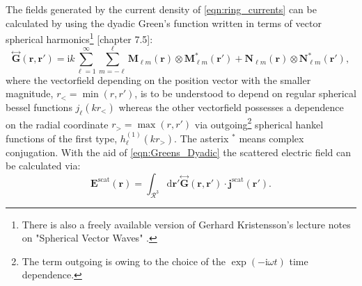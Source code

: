 \documentclass[a4paper,12pt]{scrartcl}  %
\newcommand{\imag}{\mathrm{i}}
\renewcommand{\dyad}[1]{\overset{\bm\leftrightarrow}{#1}}
\newcommand{\rd}{\mathrm{d}}
\begin{document}
The fields generated by the current density of \cref{eqn:ring_currents} can be
calculated by using the dyadic Green's function written in terms of vector spherical harmonics\footnote{There is also a freely available version of Gerhard Kristensson's lecture notes on "Spherical Vector Waves" \citep{Kristensson2014}.} \Cite{Kristensson2016}[chapter 7.5]:
\begin{equation}
\dyad{\mathbf{G}}(\mathbf{r},\mathbf{r}') = \imag k \sum_{\ell=1}^\infty \sum_{m=-\ell}^\ell
\mathbf{M}_{\ell m}(\mathbf{r})\otimes\mathbf{M}_{\ell m}^*(\mathbf{r}')+
\mathbf{N}_{\ell m}(\mathbf{r})\otimes\mathbf{N}_{\ell m}^*(\mathbf{r}'),
\label{eqn:Greens_Dyadic}
\end{equation}
where the vectorfield depending on the position vector with the smaller magnitude, $r_<=\min\left(r, r'\right)$, is to be understood to depend on regular spherical bessel functions $j_\ell(kr_<)$ whereas the other vectorfield possesses a dependence on the radial coordinate $r_>=\max\left(r, r'\right)$ via outgoing\footnote{The term outgoing is owing to the choice of the $\exp\left(-\imag\omega t\right)$ time dependence.} spherical hankel functions of the first type, $h_\ell^{(1)}(kr_>)$.
The asterix $^*$ means complex conjugation. With the aid of \cref{eqn:Greens_Dyadic} the scattered electric field can be calculated via:
\begin{equation}
\mathbf{E}^\text{scat}(\mathbf{r}) = \int_{\mathcal{R}^3}  \rd \mathbf{r}' 
\dyad{\mathbf{G}}(\mathbf{r},\mathbf{r}') \cdot \mathbf{j}^\text{scat}(\mathbf{r}').
\label{eqn:E_scattered}
\end{equation}
\end{document}
